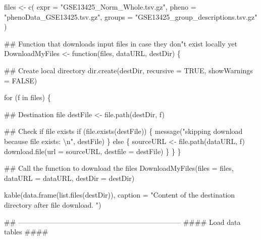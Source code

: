 \documentclass[]{article}
\newenvironment{Shaded}{\begin{snugshade}}{\end{snugshade}}
\newcommand{\CharTok}[1]{\textcolor[rgb]{0.86,0.64,0.64}{#1}}
\newcommand{\CommentTok}[1]{\textcolor[rgb]{0.50,0.62,0.50}{#1}}
\newcommand{\ControlFlowTok}[1]{\textcolor[rgb]{0.94,0.87,0.69}{#1}}
\newcommand{\DataTypeTok}[1]{\textcolor[rgb]{0.87,0.87,0.75}{#1}}
\newcommand{\KeywordTok}[1]{\textcolor[rgb]{0.94,0.87,0.69}{#1}}
\newcommand{\NormalTok}[1]{\textcolor[rgb]{0.80,0.80,0.80}{#1}}
\newcommand{\OtherTok}[1]{\textcolor[rgb]{0.94,0.94,0.56}{#1}}
\newcommand{\StringTok}[1]{\textcolor[rgb]{0.80,0.58,0.58}{#1}}
\begin{document}
\begin{Shaded}
\begin{Highlighting}[]
\NormalTok{files <-}\StringTok{ }\KeywordTok{c}\NormalTok{(}
  \DataTypeTok{expr =} \StringTok{"GSE13425_Norm_Whole.tsv.gz"}\NormalTok{,}
  \DataTypeTok{pheno =} \StringTok{"phenoData_GSE13425.tsv.gz"}\NormalTok{,}
  \DataTypeTok{groups =} \StringTok{"GSE13425_group_descriptions.tsv.gz"}
\NormalTok{)}



\CommentTok{## Function that downloads input files in case they don"t exist locally yet}
\NormalTok{DownloadMyFiles <-}\StringTok{ }\ControlFlowTok{function}\NormalTok{(files,}
\NormalTok{                            dataURL,}
\NormalTok{                            destDir) \{}

  \CommentTok{## Create local directory}
  \KeywordTok{dir.create}\NormalTok{(destDir, }\DataTypeTok{recursive =} \OtherTok{TRUE}\NormalTok{, }\DataTypeTok{showWarnings =} \OtherTok{FALSE}\NormalTok{)}

  \ControlFlowTok{for}\NormalTok{ (f }\ControlFlowTok{in}\NormalTok{ files) \{}

    \CommentTok{## Destination file}
\NormalTok{    destFile <-}\StringTok{ }\KeywordTok{file.path}\NormalTok{(destDir, f)}

    \CommentTok{## Check if file exists}
    \ControlFlowTok{if}\NormalTok{ (}\KeywordTok{file.exists}\NormalTok{(destFile)) \{}
      \KeywordTok{message}\NormalTok{(}\StringTok{"skipping download because file exists: }\CharTok{\textbackslash{}n}\StringTok{"}\NormalTok{, destFile)}
\NormalTok{    \} }\ControlFlowTok{else}\NormalTok{ \{}
\NormalTok{      sourceURL <-}\StringTok{ }\KeywordTok{file.path}\NormalTok{(dataURL, f)}
      \KeywordTok{download.file}\NormalTok{(}\DataTypeTok{url =}\NormalTok{ sourceURL, }\DataTypeTok{destfile =}\NormalTok{ destFile)}
\NormalTok{    \}}
\NormalTok{  \}}
\NormalTok{\}}




\CommentTok{## Call the function to download the files}
\KeywordTok{DownloadMyFiles}\NormalTok{(}\DataTypeTok{files =}\NormalTok{ files, }\DataTypeTok{dataURL =}\NormalTok{ dataURL, }\DataTypeTok{destDir =}\NormalTok{ destDir)}

\KeywordTok{kable}\NormalTok{(}\KeywordTok{data.frame}\NormalTok{(}\KeywordTok{list.files}\NormalTok{(destDir)),}
      \DataTypeTok{caption =} \StringTok{"Content of the destination directory after file download. "}\NormalTok{)}



\CommentTok{## ---------------------------------------------------------------------}
\CommentTok{#### Load data tables ####}


\end{Highlighting}
\end{Shaded}
\end{document}
